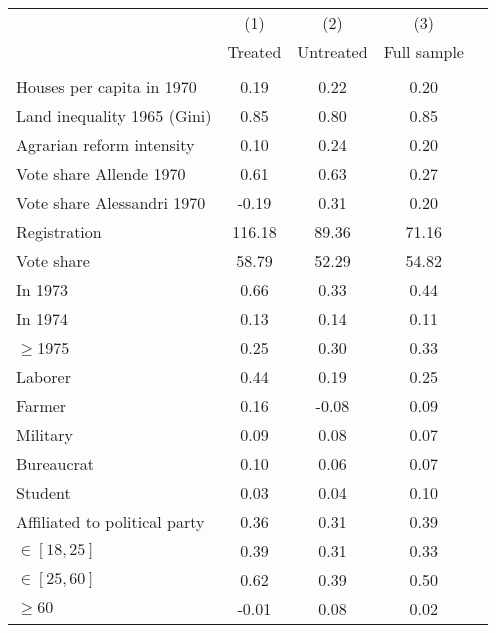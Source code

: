 \begin{tabular}{l c c c c} \toprule\toprule
& (1) & (2) & (3) \\
& Treated & Untreated & Full sample\\
&\\
Houses per capita in 1970 &      0.19 &      0.22    &      0.20 \\
Land inequality 1965 \small{(Gini)} &      0.85 &      0.80    &      0.85 \\
Agrarian reform intensity &      0.10 &      0.24    &      0.20 \\
Vote share Allende 1970 &      0.61 &      0.63  &      0.27 \\
Vote share Alessandri 1970 &     -0.19 &      0.31   &      0.20 \\
Registration &    116.18 &     89.36    &     71.16 \\
Vote share   &     58.79 &     52.29    &     54.82 \\
In 1973 &        0.66 &        0.33 &      0.44   \\
In 1974   &        0.13 &        0.14 &      0.11   \\
$\geq$1975 &        0.25 &        0.30   &      0.33   \\
Laborer &        0.44 &        0.19 &      0.25   \\
Farmer &      0.16 &     -0.08   &      0.09 \\
Military &        0.09 &        0.08  &      0.07   \\
Bureaucrat &        0.10 &        0.06 &      0.07   \\
Student &      0.03 &      0.04    &      0.10 \\
Affiliated to political party &      0.36 &      0.31 &      0.39\\
$\in[18,25]$ &      0.39 &      0.31    &      0.33 \\
$\in[25,60]$ &      0.62 &      0.39    &      0.50 \\
$\geq 60$ &     -0.01 &      0.08    &      0.02 \\
\toprule\toprule
\end{tabular} 
